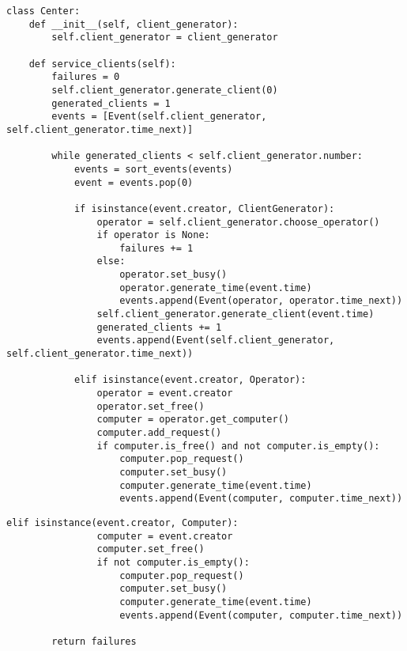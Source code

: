 \begin{center}
\captionsetup{justification=raggedright,singlelinecheck=off}
\begin{lstlisting}[label=lst:center-1,caption=Реализация работы информационного центра (часть 1)]
class Center:
    def __init__(self, client_generator):
        self.client_generator = client_generator

    def service_clients(self):
        failures = 0
        self.client_generator.generate_client(0)
        generated_clients = 1
        events = [Event(self.client_generator, self.client_generator.time_next)]

        while generated_clients < self.client_generator.number:
            events = sort_events(events)
            event = events.pop(0)

            if isinstance(event.creator, ClientGenerator):
                operator = self.client_generator.choose_operator()
                if operator is None:
                    failures += 1
                else:
                    operator.set_busy()
                    operator.generate_time(event.time)
                    events.append(Event(operator, operator.time_next))
                self.client_generator.generate_client(event.time)
                generated_clients += 1
                events.append(Event(self.client_generator, self.client_generator.time_next))

            elif isinstance(event.creator, Operator):
                operator = event.creator
                operator.set_free()
                computer = operator.get_computer()
                computer.add_request()
                if computer.is_free() and not computer.is_empty():
                    computer.pop_request()
                    computer.set_busy()
                    computer.generate_time(event.time)
                    events.append(Event(computer, computer.time_next))
\end{lstlisting}
\end{center}

\begin{center}
\captionsetup{justification=raggedright,singlelinecheck=off}
\begin{lstlisting}[label=lst:center-2,caption=Реализация работы информационного центра (часть 2)]
            elif isinstance(event.creator, Computer):
                computer = event.creator
                computer.set_free()
                if not computer.is_empty():
                    computer.pop_request()
                    computer.set_busy()
                    computer.generate_time(event.time)
                    events.append(Event(computer, computer.time_next))

        return failures

\end{lstlisting}
\end{center}

